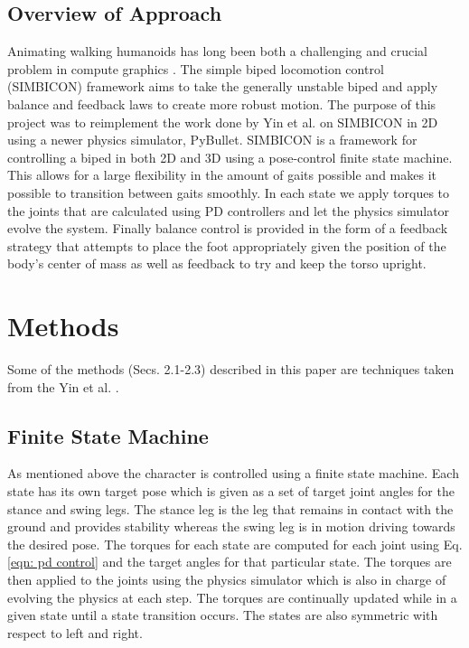 \documentclass[12pt, a4paper]{article}
\begin{document}
\subsection{Overview of Approach}
Animating walking humanoids has long been both a challenging and crucial problem in compute graphics \cite{walking_survey}. The simple biped locomotion control (SIMBICON) framework \cite{Yin07} aims to take the generally unstable biped and apply balance and feedback laws to create more robust motion.  The purpose of this project was to reimplement the work done by Yin et al. \cite{Yin07} on SIMBICON in 2D using a newer physics simulator, PyBullet. SIMBICON is a framework for controlling a biped in both 2D and 3D using a pose-control finite state machine. This allows for a large flexibility in the amount of gaits possible and makes it possible to transition between gaits smoothly. In each state we apply torques to the joints that are calculated using PD controllers and let the physics simulator evolve the system. Finally balance control is provided in the form of a feedback strategy that attempts to place the foot appropriately given the position of the body's center of mass as well as feedback to try and keep the torso upright.  

\newpage
\section{Methods}
Some of the methods (Secs. 2.1-2.3) described in this paper are techniques taken from the Yin et al. \cite{Yin07}. 
\subsection{Finite State Machine}
As mentioned above the character is controlled using a finite state machine. Each state has its own target pose which is given as a set of target joint angles for the stance and swing legs. The stance leg is the leg that remains in contact with the ground and provides stability whereas the swing leg is in motion driving towards the desired pose. The torques for each state are computed for each joint using Eq. \ref{eqn: pd control} and the target angles for that particular state. The torques are then applied to the joints using the physics simulator which is also in charge of evolving the physics at each step. The torques are continually updated while in a given state until a state transition occurs. The states are also symmetric with respect to left and right. \\ 
\end{document}
